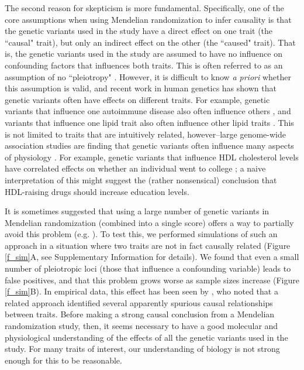 \documentclass[11pt,titlepage]{article}
\begin{document}
The second reason for skepticism is more fundamental. Specifically, one of the core assumptions when using Mendelian randomization to infer causality is that the genetic variants used in the study have a direct effect on one trait (the ``causal" trait), but only an indirect effect on the other (the ``caused" trait). That is, the genetic variants used in the study are assumed to have no influence on confounding factors that influences both traits. This is often referred to as an assumption of no ``pleiotropy" \citep{Davey-Smith:2014aa}. However, it is difficult to know \emph{a priori} whether this assumption is valid, and recent work in human genetics has shown that genetic variants often have effects on different traits. For example, genetic variants that influence one autoimmune disease also often influence others \citep{Cotsapas:2011aa}, and variants that influence one lipid trait also often influence other lipid traits \citep{teslovich2010biological}. This is not limited to traits that are intuitively related, however--large genome-wide association studies are finding that genetic variants often influence many aspects of physiology \citep{bulik2015atlas}. For example, genetic variants that influence HDL cholesterol levels have correlated effects on whether an individual went to college \citep{bulik2015atlas}; a naive interpretation of this might suggest the (rather nonsensical) conclusion that HDL-raising drugs should increase education levels.

It is sometimes suggested that using a large number of genetic variants in Mendelian randomization (combined into a single score) offers a way to partially avoid this problem (e.g. \citep{Holmes:2014aa, Davey-Smith:2014aa}). To test this, we performed simulations of such an approach in a situation where two traits are not in fact causally related (Figure \ref{f_sim}A, see Supplementary Information for details). We found that even a small number of pleiotropic loci (those that influence a confounding variable) leads to false positives, and that this problem grows worse as sample sizes increase (Figure \ref{f_sim}B). In empirical data, this effect has been seen by \citet{Evans:2013aa}, who noted that a related approach identified several apparently spurious causal relationships between traits. Before making a strong causal conclusion from a Mendelian randomization study, then, it seems necessary to have a good molecular and physiological understanding of the effects of all the genetic variants used in the study. For many traits of interest, our understanding of biology is not strong enough for this to be reasonable.
\end{document}
